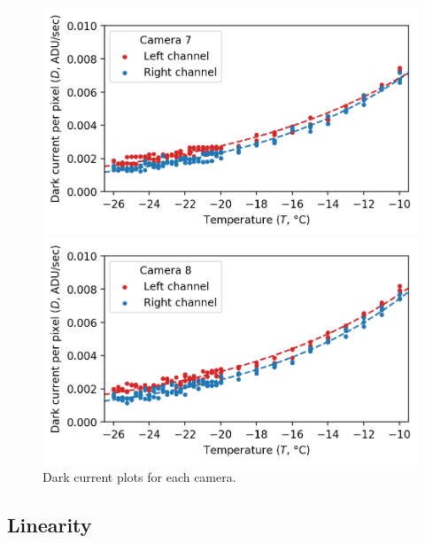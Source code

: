 \begin{colsection}
\begin{colsection}
\begin{figure}[p]
\begin{center}
        \begin{minipage}[t]{0.49\textwidth}\vspace{10pt}
            \includegraphics[width=\linewidth]{images/detectors/dc_7.png}
        \end{minipage}
        \begin{minipage}[t]{0.49\textwidth}\vspace{10pt}
            \includegraphics[width=\linewidth]{images/detectors/dc_8.png}
        \end{minipage}
    \end{center}
    \caption[Dark current plots]{
        Dark current plots for each camera.
    }\label{fig:dcs}
\end{figure}

\clearpage

\end{colsection}

\newpage
\subsection{Linearity}
\label{sec:lin}
\begin{colsection}


\end{colsection}
\end{colsection}
